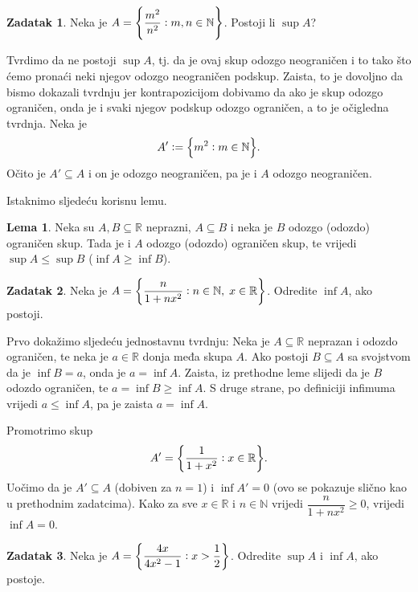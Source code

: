 \documentclass{book}
\let\originalleft\left
\let\originalright\right
\renewcommand{\left}{\mathopen{}\mathclose\bgroup\originalleft}
\renewcommand{\right}{\aftergroup\egroup\originalright}
\renewenvironment{proof}{%
    \vspace{-\parskip}\begin{oldproof}%
    }{%
    \end{oldproof}%
}
\theoremstyle{definition}
\newtheorem{lemma}{Lema}
\theoremstyle{definition}
\newtheorem{exercise}{Zadatak}
\theoremstyle{remark}
\begin{document}
\begin{exercise}
Neka je $A=\left\{\dfrac{m^2}{n^2} : m, n\in \mathbb{N}\right\}$. Postoji li $\sup{A}$?
\end{exercise}
\begin{proof}[Rješenje]
Tvrdimo da ne postoji $\sup{A}$, tj. da je ovaj skup odozgo neograničen i to tako što ćemo pronaći neki njegov odozgo neograničen podskup. Zaista, to je dovoljno da bismo dokazali tvrdnju jer kontrapozicijom dobivamo da ako je skup odozgo ograničen, onda je i svaki njegov podskup odozgo ograničen, a to je očigledna tvrdnja. Neka je $$A':=\left\{m^2 : m\in \mathbb{N}\right\}.$$ Očito je $A'\subseteq A$ i on je odozgo neograničen, pa je i $A$ odozgo neograničen.
\end{proof}
Istaknimo sljedeću korisnu lemu.
\begin{lemma}
Neka su $A, B\subseteq \mathbb{R}$ neprazni, $A\subseteq B$ i neka je $B$ odozgo (odozdo) ograničen skup. Tada je i $A$ odozgo (odozdo) ograničen skup, te vrijedi $\sup{A}\leq \sup{B}$ ($\inf{A}\geq \inf{B}$).
\end{lemma}
\begin{exercise}
Neka je $A=\left\{\dfrac{n}{1+nx^2} : n\in \mathbb{N},\; x\in \mathbb{R}\right\}$. Odredite $\inf{A}$, ako postoji.
\end{exercise}
\begin{proof}[Rješenje]
Prvo dokažimo sljedeću jednostavnu tvrdnju: Neka je $A\subseteq \mathbb{R}$ neprazan i odozdo ograničen, te neka je $a\in \mathbb{R}$ donja međa skupa $A$. Ako postoji $B\subseteq A$ sa svojstvom da je $\inf{B}=a$, onda je $a=\inf{A}$. Zaista, iz prethodne leme slijedi da je $B$ odozdo ograničen, te $a=\inf{B}\geq \inf{A}$. S druge strane, po definiciji infimuma vrijedi $a\leq \inf{A}$, pa je zaista $a=\inf{A}$.

Promotrimo skup
$$A'=\left\{\dfrac{1}{1+x^2} : x\in \mathbb{R}\right\}.$$
Uočimo da je $A'\subseteq A$ (dobiven za $n=1$) i $\inf{A'}=0$ (ovo se pokazuje slično kao u prethodnim zadatcima). Kako za sve $x\in \mathbb{R}$ i $n\in \mathbb{N}$ vrijedi $\dfrac{n}{1+nx^2}\geq 0$, vrijedi $\inf{A}=0$.
\end{proof}
\begin{exercise}
Neka je $A=\left\{\dfrac{4x}{4x^2-1} : x>\dfrac{1}{2}\right\}$. Odredite $\sup{A}$ i $\inf{A}$, ako postoje.
\end{exercise}
\end{document}
